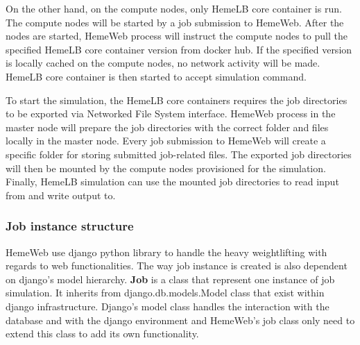 On the other hand, on the compute nodes, only HemeLB core container is run. The compute nodes will be started by a job submission to HemeWeb. After the nodes are started, HemeWeb process will instruct the compute nodes to pull the specified HemeLB core container version from docker hub. If the specified version is locally cached on the compute nodes, no network activity will be made. HemeLB core container is then started to accept simulation command.

To start the simulation, the HemeLB core containers requires the job directories to be exported via Networked File System interface. HemeWeb process in the master node will prepare the job directories with the correct folder and files locally in the master node. Every job submission to HemeWeb will create a specific folder for storing submitted job-related files. The exported job directories will then be mounted by the compute nodes provisioned for the simulation. Finally, HemeLB simulation can use the mounted job directories to read input from and write output to.


\subsubsection{Job instance structure}
HemeWeb use django python library to handle the heavy weightlifting with regards to web functionalities. The way job instance is created is also dependent on django's model hierarchy. \textbf{Job} is a class that represent one instance of job simulation. It inherits from django.db.models.Model class that exist within django infrastructure. Django's model class handles the interaction with the database and with the django environment and HemeWeb's job class only need to extend this class to add its own functionality.


